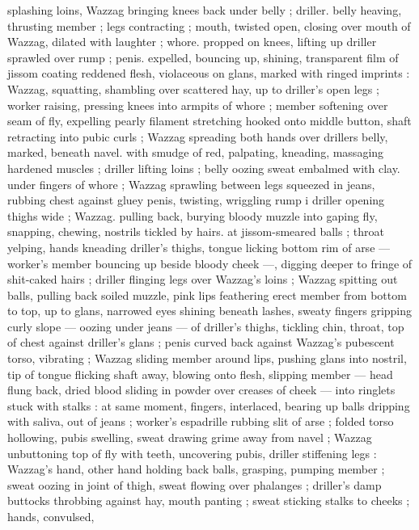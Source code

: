 splashing loins, Wazzag bringing knees back under belly ; driller. 
belly heaving, thrusting member ; legs contracting ; mouth, twisted 
open, closing over mouth of Wazzag, dilated with laughter ; whore. 
propped on knees, lifting up driller sprawled over rump ; penis. 
expelled, bouncing up, shining, transparent film of jissom coating 
reddened flesh, violaceous on glans, marked with ringed imprints : 
Wazzag, squatting, shambling over scattered hay, up to driller's open 
legs ; worker raising, pressing knees into armpits of whore ; member 
softening over seam of fly, expelling pearly filament stretching 
hooked onto middle button, shaft retracting into pubic curls ; Wazzag 
spreading both hands over drillers belly, marked, beneath navel. 
with smudge of red, palpating, kneading, massaging hardened 
muscles ; driller lifting loins ; belly oozing sweat embalmed with clay. 
under fingers of whore ; Wazzag sprawling between legs squeezed 
in jeans, rubbing chest against gluey penis, twisting, wriggling rump 
i driller opening thighs wide ; Wazzag. pulling back, burying bloody 
muzzle into gaping fly, snapping, chewing, nostrils tickled by hairs. 
at jissom-smeared balls ; throat yelping, hands kneading driller's 
thighs, tongue licking bottom rim of arse --- worker's member 
bouncing up beside bloody cheek ---, digging deeper to fringe of 
shit-caked hairs ; driller flinging legs over Wazzag's loins ; Wazzag 
spitting out balls, pulling back soiled muzzle, pink lips feathering 
erect member from bottom to top, up to glans, narrowed eyes shining 
beneath lashes, sweaty fingers gripping curly slope --- oozing under 
jeans --- of driller's thighs, tickling chin, throat, top of chest against 
driller's glans ; penis curved back against Wazzag's pubescent torso, 
vibrating ; Wazzag sliding member around lips, pushing glans into 
nostril, tip of tongue flicking shaft away, blowing onto flesh, slipping 
member --- head flung back, dried blood sliding in powder over 
creases of cheek --- into ringlets stuck with stalks : at same moment, 
fingers, interlaced, bearing up balls dripping with saliva, out of jeans 
; worker's espadrille rubbing slit of arse ; folded torso hollowing, 
pubis swelling, sweat drawing grime away from navel ; Wazzag 
unbuttoning top of fly with teeth, uncovering pubis, driller stiffening 
legs : Wazzag's hand, other hand holding back balls, grasping, 
pumping member ; sweat oozing in joint of thigh, sweat flowing over 
phalanges ; driller's damp buttocks throbbing against hay, mouth 
panting ; sweat sticking stalks to cheeks ; hands, convulsed, 
